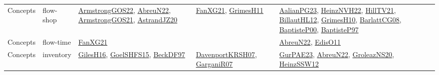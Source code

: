 {\begin{longtable}{lp{3cm}>{\raggedright}p{6cm}>{\raggedright}p{6cm}p{8cm}}
Concepts & flow-shop & \href{papers/ArmstrongGOS22.pdf}{ArmstrongGOS22}\cite{ArmstrongGOS22}, \href{articles/AbreuN22.pdf}{AbreuN22}\cite{AbreuN22}, \href{papers/ArmstrongGOS21.pdf}{ArmstrongGOS21}\cite{ArmstrongGOS21}, \href{articles/AstrandJZ20.pdf}{AstrandJZ20}\cite{AstrandJZ20} & \href{articles/FanXG21.pdf}{FanXG21}\cite{FanXG21}, \href{papers/GrimesH11.pdf}{GrimesH11}\cite{GrimesH11} & \href{papers/AalianPG23.pdf}{AalianPG23}\cite{AalianPG23}, \href{articles/HeinzNVH22.pdf}{HeinzNVH22}\cite{HeinzNVH22}, \href{papers/HillTV21.pdf}{HillTV21}\cite{HillTV21}, \href{papers/BillautHL12.pdf}{BillautHL12}\cite{BillautHL12}, \href{papers/GrimesH10.pdf}{GrimesH10}\cite{GrimesH10}, \href{papers/BarlattCG08.pdf}{BarlattCG08}\cite{BarlattCG08}, \href{articles/BaptisteP00.pdf}{BaptisteP00}\cite{BaptisteP00}, \href{papers/BaptisteP97.pdf}{BaptisteP97}\cite{BaptisteP97}\\
Concepts & flow-time & \href{articles/FanXG21.pdf}{FanXG21}\cite{FanXG21} &  & \href{articles/AbreuN22.pdf}{AbreuN22}\cite{AbreuN22}, \href{papers/EdisO11.pdf}{EdisO11}\cite{EdisO11}\\
Concepts & inventory & \href{papers/GilesH16.pdf}{GilesH16}\cite{GilesH16}, \href{articles/GoelSHFS15.pdf}{GoelSHFS15}\cite{GoelSHFS15}, \href{papers/BeckDF97.pdf}{BeckDF97}\cite{BeckDF97} & \href{papers/DavenportKRSH07.pdf}{DavenportKRSH07}\cite{DavenportKRSH07}, \href{papers/GarganiR07.pdf}{GarganiR07}\cite{GarganiR07} & \href{articles/GurPAE23.pdf}{GurPAE23}\cite{GurPAE23}, \href{articles/AbreuN22.pdf}{AbreuN22}\cite{AbreuN22}, \href{papers/GroleazNS20.pdf}{GroleazNS20}\cite{GroleazNS20}, \href{articles/HeinzSSW12.pdf}{HeinzSSW12}\cite{HeinzSSW12}\\

\end{longtable}}
